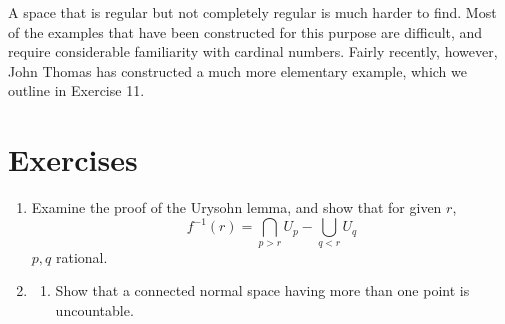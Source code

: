 A space that is regular but not completely regular is much harder to find. Most of the examples that have been constructed for this purpose are difficult, and require considerable familiarity with cardinal numbers. Fairly recently, however, John Thomas \cite{Thomas1969} has constructed a much more elementary example, which we outline in Exercise 11.
\section*{Exercises}
\begin{enumerate}[itemsep=0.4em, parsep=0pt, topsep=0pt, partopsep=0pt, leftmargin=*, label=\arabic*., ref=\arabic*]
\item Examine the proof of the Urysohn lemma, and show that for given \(r\), \[ f^{-1}( r) = \mathop{\bigcap }\limits_{{p > r}}U_{p} - \mathop{\bigcup }\limits_{{q < r}}U_{q} \] \(p,q\) rational.
\item
 \begin{enumerate}[itemsep=0.2em, parsep=0pt, topsep=0pt, partopsep=0pt, leftmargin=*, label=(\alph*), align=left]
 \item Show that a connected normal space having more than one point is uncountable.


\end{enumerate}
\end{enumerate}
